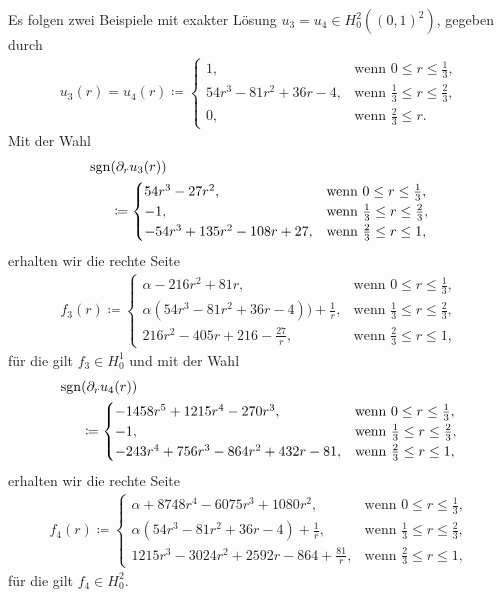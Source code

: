 Es folgen zwei Beispiele mit exakter Lösung $u_3=u_4 \in H^2_0((0,1)^2)$, 
gegeben durch 
\begin{align*}
  u_3(r)=u_4(r)\coloneqq 
  \begin{cases}
    1, & \text{wenn } 0\leq r\leq\frac{1}{3},\\
    54r^3 - 81r^2 + 36r - 4, & 
    \text{wenn } \frac{1}{3}\leq r\leq \frac{2}{3},\\
    0, & \text{wenn } \frac{2}{3}\leq r.
  \end{cases}
\end{align*}
Mit der Wahl
\begin{align*}
  \operatorname{sgn}&(\partial_r u_3(r)) \\
  &\coloneqq 
  \begin{cases}
    54r^3-27r^2, & \text{wenn } 0\leq r\leq\frac{1}{3},\\
    -1, & \text{wenn } \frac{1}{3}\leq r\leq \frac{2}{3},\\
    -54r^3 + 135r^2 - 108r + 27, & \text{wenn } \frac{2}{3}\leq r\leq 1,
  \end{cases}
\end{align*}
erhalten wir die rechte Seite
\begin{align*}
  f_3(r)\coloneqq 
  \begin{cases}
    \alpha - 216r^2 + 81r, &
    \text{wenn } 0\leq r\leq\frac{1}{3},\\
    \alpha\left(54r^3 - 81r^2 + 36r - 4\right)) + \frac{1}{r}, & 
    \text{wenn } \frac{1}{3}\leq r\leq \frac{2}{3},\\
    216r^2 - 405r + 216 - \frac{27}{r}, & 
    \text{wenn } \frac{2}{3}\leq r\leq 1,
  \end{cases}
\end{align*}
für die gilt $f_3\in H^1_0$
und mit der Wahl
\begin{align*}
  \operatorname{sgn}&(\partial_r u_4(r)) \\
  &\coloneqq 
  \begin{cases}
    -1458r^5 + 1215r^4 - 270r^3, & \text{wenn } 0\leq r\leq\frac{1}{3},\\
    -1, & \text{wenn } \frac{1}{3}\leq r\leq \frac{2}{3},\\
    -243r^4 + 756r^3 - 864r^2 + 432r - 81, 
    & \text{wenn } \frac{2}{3}\leq r\leq 1,
  \end{cases}
\end{align*}
erhalten wir die rechte Seite
\begin{align*}
  f_4(r)\coloneqq 
  \begin{cases}
    \alpha + 8748r^4 - 6075r^3 + 1080r^2, &
    \text{wenn } 0\leq r\leq\frac{1}{3},\\
    \alpha\left(54r^3 - 81r^2 + 36r - 4\right) + \frac{1}{r}, & 
    \text{wenn } \frac{1}{3}\leq r\leq \frac{2}{3},\\
    1215r^3 - 3024r^2 + 2592r - 864 + \frac{81}{r}, & 
    \text{wenn } \frac{2}{3}\leq r\leq 1,
  \end{cases}
\end{align*}
für die gilt $f_4\in H^2_0$.

